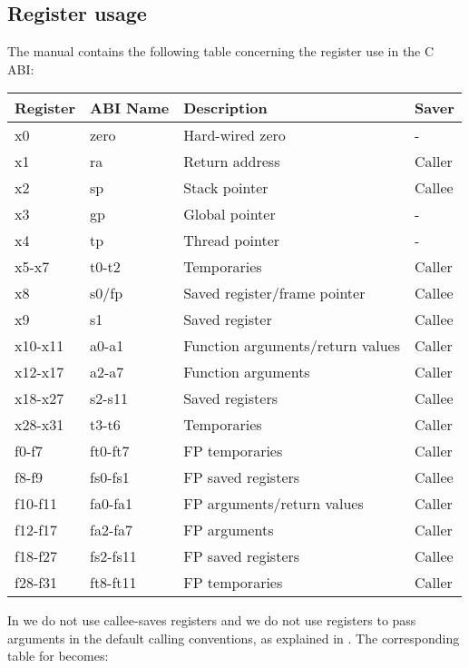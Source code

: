 \chapter{\riscv{}}
\label{chapter-backend-risc-v}

\section{Register usage}
\label{sec-backend-risc-v-register-usage}

The \riscv{} manual contains the following table concerning the register
use in the C ABI:

{\small
\begin{tabular}{|l|l|l|l|}
  \hline
  Register & ABI Name & Description & Saver\\
  \hline
  \hline
  x0 & zero & Hard-wired zero & -\\
  x1 & ra & Return address & Caller\\
  x2 & sp & Stack pointer & Callee\\
  x3 & gp & Global pointer & -\\
  x4 & tp & Thread pointer & -\\
  x5-x7 & t0-t2 & Temporaries & Caller\\
  x8 & s0/fp & Saved register/frame pointer & Callee\\
  x9 & s1 & Saved register & Callee\\
  x10-x11 & a0-a1 & Function arguments/return values & Caller\\
  x12-x17 & a2-a7 & Function arguments & Caller\\
  x18-x27 & s2-s11 & Saved registers & Callee\\
  x28-x31 & t3-t6 & Temporaries & Caller\\
  \hline
  f0-f7 & ft0-ft7 & FP temporaries & Caller\\
  f8-f9 & fs0-fs1 & FP saved registers & Callee\\
  f10-f11 & fa0-fa1 & FP arguments/return values & Caller\\
  f12-f17 & fa2-fa7 & FP arguments & Caller\\
  f18-f27 & fs2-fs11 & FP saved registers & Callee\\
  f28-f31 & ft8-ft11 & FP temporaries & Caller\\
  \hline
\end{tabular}}

In \sysname{} we do not use callee-saves registers and we do not use
registers to pass arguments in the default calling conventions, as
explained in .  The
corresponding table for \sysname{} becomes:

